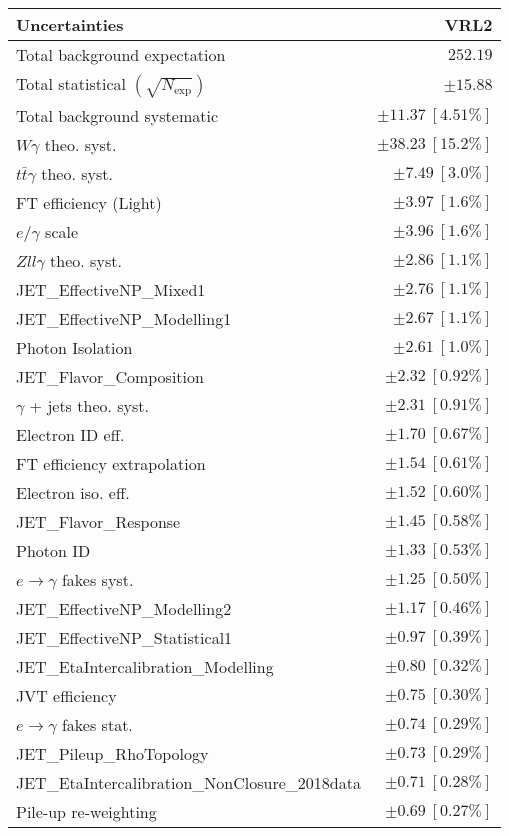 \begin{tabular}{lr}
\hline
\textbf{Uncertainties} & \textbf{VRL2} \\
\hline
Total background expectation & $252.19$ \\
\hline
Total statistical $(\sqrt{N_\mathrm{exp}})$ & $\pm 15.88$ \\
Total background systematic & $\pm 11.37\ [4.51\%]$ \\
\hline
\hline
$W\gamma$ theo. syst. & $\pm 38.23\ [15.2\%]$ \\
$t\bar{t}\gamma$ theo. syst. & $\pm 7.49\ [3.0\%]$ \\
FT efficiency (Light) & $\pm 3.97\ [1.6\%]$ \\
$e/\gamma$ scale & $\pm 3.96\ [1.6\%]$ \\
$Zll\gamma$ theo. syst. & $\pm 2.86\ [1.1\%]$ \\
JET\_EffectiveNP\_Mixed1 & $\pm 2.76\ [1.1\%]$ \\
JET\_EffectiveNP\_Modelling1 & $\pm 2.67\ [1.1\%]$ \\
Photon Isolation & $\pm 2.61\ [1.0\%]$ \\
JET\_Flavor\_Composition & $\pm 2.32\ [0.92\%]$ \\
$\gamma$ + jets theo. syst. & $\pm 2.31\ [0.91\%]$ \\
Electron ID eff. & $\pm 1.70\ [0.67\%]$ \\
FT efficiency extrapolation & $\pm 1.54\ [0.61\%]$ \\
Electron iso. eff. & $\pm 1.52\ [0.60\%]$ \\
JET\_Flavor\_Response & $\pm 1.45\ [0.58\%]$ \\
Photon ID & $\pm 1.33\ [0.53\%]$ \\
$e\to\gamma$ fakes syst. & $\pm 1.25\ [0.50\%]$ \\
JET\_EffectiveNP\_Modelling2 & $\pm 1.17\ [0.46\%]$ \\
JET\_EffectiveNP\_Statistical1 & $\pm 0.97\ [0.39\%]$ \\
JET\_EtaIntercalibration\_Modelling & $\pm 0.80\ [0.32\%]$ \\
JVT efficiency & $\pm 0.75\ [0.30\%]$ \\
$e\to\gamma$ fakes stat. & $\pm 0.74\ [0.29\%]$ \\
JET\_Pileup\_RhoTopology & $\pm 0.73\ [0.29\%]$ \\
JET\_EtaIntercalibration\_NonClosure\_2018data & $\pm 0.71\ [0.28\%]$ \\
Pile-up re-weighting & $\pm 0.69\ [0.27\%]$ \\

\end{tabular}
